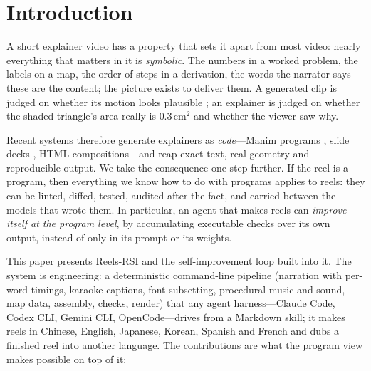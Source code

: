 \documentclass[11pt]{article}
\newcommand{\sys}{Reels-RSI}
\begin{document}
\section{Introduction}

A short explainer video has a property that sets it apart from most video: nearly everything that
matters in it is \emph{symbolic}. The numbers in a worked problem, the labels on a map, the order
of steps in a derivation, the words the narrator says---these are the content; the picture exists
to deliver them. A generated clip is judged on whether its motion looks plausible
\citep{vbench2}; an explainer is judged on whether the shaded triangle's area really is
$0.3\,\mathrm{cm}^2$ and whether the viewer saw why.

Recent systems therefore generate explainers as \emph{code}---Manim programs
\citep{theoremexplain2025,code2video2026,manimagent2026}, slide decks \citep{paper2video2025}, HTML
compositions---and reap exact text, real geometry and reproducible output. We take the consequence
one step further. If the reel is a program, then everything we know how to do with programs applies
to reels: they can be linted, diffed, tested, audited after the fact, and carried between the
models that wrote them. In particular, an agent that makes reels can \emph{improve itself at the
program level}, by accumulating executable checks over its own output, instead of only in its
prompt or its weights.

This paper presents \sys{} and the self-improvement loop built into it. The system is engineering:
a deterministic command-line pipeline (narration with per-word timings, karaoke captions, font
subsetting, procedural music and sound, map data, assembly, checks, render) that any agent
harness---Claude Code, Codex CLI, Gemini CLI, OpenCode---drives from a Markdown skill; it makes
reels in Chinese, English, Japanese, Korean, Spanish and French and dubs a finished reel into
another language. The contributions are what the program view makes possible on top of it:
\end{document}
